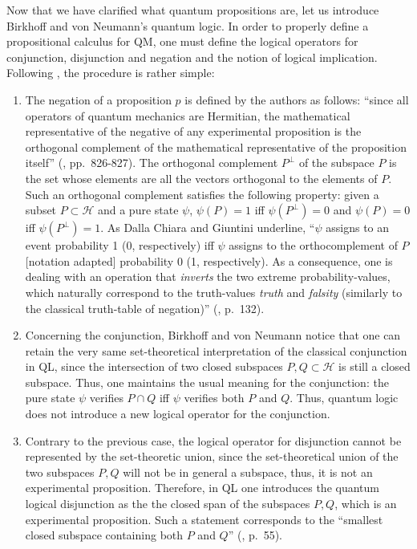 \documentclass[11pt, executivepaper]{article}
\begin{document}
Now that we have clarified what quantum propositions are, let us introduce Birkhoff and von Neumann's quantum logic. In order to properly define a propositional calculus for QM, one must define the logical operators for conjunction, disjunction and negation and the notion of logical implication. Following \cite{vonNeumann:1936}, the procedure is rather simple: 
\begin{enumerate}
\item The negation of a proposition $p$ is defined by the authors as follows: ``since all operators of quantum mechanics are Hermitian, the mathematical representative of the negative of any experimental proposition is the orthogonal complement of the mathematical representative of the proposition itself'' (\cite{vonNeumann:1936}, pp.\ 826-827). The orthogonal complement $P^{\perp}$ of the subspace $P$ is the set whose elements are all the vectors orthogonal to the elements of $P$. Such an orthogonal complement satisfies the following property: given a subset $P\subset\mathcal{H}$ and a pure state $\psi$, $\psi(P)=1$ iff $\psi(P^{\perp})=0$ and $\psi(P)=0$ iff $\psi(P^{\perp})=1$. As Dalla Chiara and Giuntini underline, ``$\psi$ assigns to an event probability 1 (0, respectively) iff $\psi$ assigns to the orthocomplement of $P$ [notation adapted] probability 0 (1, respectively). As a consequence, one is dealing with an operation that \emph{inverts} the two extreme probability-values, which naturally correspond to the truth-values \emph{truth} and \emph{falsity} (similarly to the classical truth-table of negation)'' (\cite{Giuntini:2002}, p.\ 132).
\item Concerning the conjunction, Birkhoff and von Neumann notice that one can retain the very same set-theoretical interpretation of the classical conjunction in QL, since the intersection of two closed subspaces $P, Q\subset\mathcal{H}$ is still a closed subspace. Thus, one maintains the usual meaning for the conjunction: the pure state $\psi$ verifies $P\cap Q$ iff $\psi$ verifies both $P$ and $Q$. Thus, quantum logic does not introduce a new logical operator for the conjunction.
\item Contrary to the previous case, the logical operator for disjunction cannot be represented by the set-theoretic union, since the set-theoretical union of the two subspaces $P, Q$ will not be in general a subspace, thus, it is not an experimental proposition. Therefore, in QL one introduces the quantum logical disjunction as the the closed span of the subspaces $P, Q$, which is an experimental proposition. Such a statement corresponds to the ``smallest closed subspace containing both $P$ and $Q$'' (\cite{Bacciagaluppi:2009}, p.\ 55). 

\end{enumerate}
\end{document}

